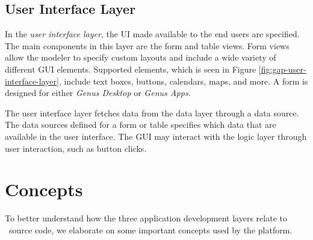 
\subsection{User Interface Layer}
\label{sub:User Interface Layer}
In the \textit{user interface layer}, the UI made available to the end users are specified. The main components in this layer are the form and table views. Form views allow the modeler to specify custom layouts and include a wide variety of different GUI elements. Supported elements, which is seen in Figure \ref{fig:gap-user-interface-layer}, include text boxes, buttons, calendars, maps, and more. A form is designed for either \textit{Genus Desktop} or \textit{Genus Apps}. 

The user interface layer fetches data from the data layer through a data source. The data sources defined for a form or table specifies which data that are available in the user interface. The GUI may interact with the logic layer through user interaction, such as button clicks. 

\section{Concepts}
\label{sec:Concepts}
To better understand how the three application development layers relate to \gap~source code, we elaborate on some important concepts used by the platform.

